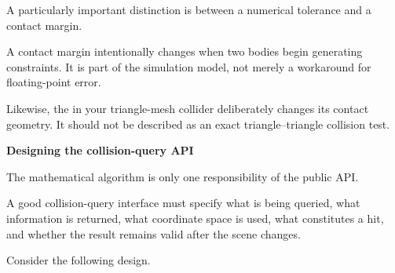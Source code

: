 A particularly important distinction is between a numerical tolerance and a contact margin.

A contact margin intentionally changes when two bodies begin generating constraints. It is part of the simulation model, not merely a workaround for floating-point error.

Likewise, the  in your triangle-mesh collider deliberately changes its contact geometry. It should not be described as an exact triangle--triangle collision test.

\textbf{Designing the collision-query API}

The mathematical algorithm is only one responsibility of the public API.

A good collision-query interface must specify what is being queried, what information is returned, what coordinate space is used, what constitutes a hit, and whether the result remains valid after the scene changes.

Consider the following design.

